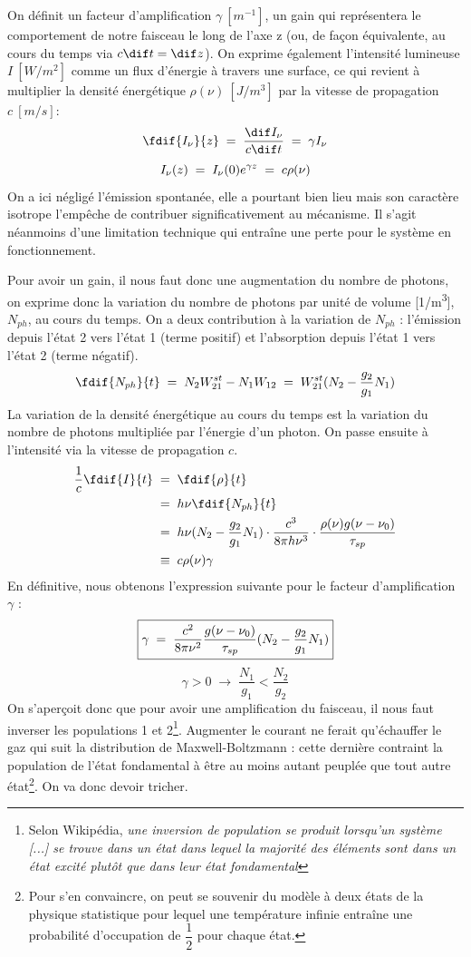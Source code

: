 On définit un facteur d'amplification $\gamma\ [\si{m^{-1}}]$, un gain qui représentera le comportement de notre faisceau le long de l'axe z (ou, de façon équivalente, au cours du temps via $c\dif t = \dif z$). On exprime également l'intensité lumineuse $I\ [\si{W/m^2}]$ comme un flux d'énergie à travers une surface, ce qui revient à multiplier la densité énergétique $\rho(\nu)\ [\si{J/m^3}]$ par la vitesse de propagation $c\ [\si{m/s}]$:
\[
    \fdif{I_\nu}{z} \eq \dfrac{\dif I_\nu}{c\dif t} \eq \gamma I_\nu
\]
\[
    I_\nu(z) \; = \; I_\nu(0) e^{\gamma z} \; = \; c\rho(\nu)
\]
On a ici négligé l'émission spontanée, elle a pourtant bien lieu mais son caractère isotrope l'empêche de contribuer significativement au mécanisme. Il s'agit néanmoins d'une limitation technique qui entraîne une perte pour le système en fonctionnement.

Pour avoir un gain, il nous faut donc une augmentation du nombre de photons, on exprime donc la variation du nombre de photons par unité de volume [\si{1/m^3}], $N_{ph}$, au cours du temps. On a deux contribution à la variation de $N_{ph}$ : l'émission depuis l'état 2 vers l'état 1 (terme positif) et l'absorption depuis l'état 1 vers l'état 2 (terme négatif).
\[
    \fdif{N_{ph}}{t}
    \eq N_2 W_{21}^{st} - N_1 W_{12}
    \eq W_{21}^{st} (N_2 - \dfrac{g_2}{g_1}N_1)
\]
La variation de la densité énergétique au cours du temps est la variation du nombre de photons multipliée par l'énergie d'un photon. On passe ensuite à l'intensité via la vitesse de propagation $c$.
\begin{align*}
    \dfrac{1}{c}\fdif{I}{t}
    &\eq  \fdif{\rho}{t}\\
    &\eq  h\nu\fdif{N_{ph}}{t}\\
    &\eq  h\nu (N_2 - \dfrac{g_2}{g_1}N_1) \cdot \dfrac{c^3}{8\pi h \nu^3} \cdot \dfrac{\rho(\nu) g(\nu - \nu_0)}{\tau_{sp}}\\
    &\;\equiv\;  c\rho(\nu)\gamma
\end{align*}
En définitive, nous obtenons l'expression suivante pour le facteur d'amplification $\gamma$ :
\begin{equation}
    \boxed{
        \gamma \; = \; \dfrac{c^2}{8\pi\nu^2}\dfrac{g(\nu - \nu_0)}{\tau_{sp}}(N_2 - \dfrac{g_2}{g_1}N_1)
    }
\end{equation}
\[
\boxed{
    \gamma > 0 \; \longrightarrow \; \dfrac{N_1}{g_1} < \dfrac{N_2}{g_2}
    }
\]
On s'aperçoit donc que pour avoir une amplification du faisceau, il nous faut inverser les populations 1 et 2\footnote{Selon Wikipédia, \textit{une inversion de population se produit lorsqu'un système [...] se trouve dans un état dans lequel la majorité des éléments sont dans un état excité plutôt que dans leur état fondamental}}. Augmenter le courant ne ferait qu'échauffer le gaz qui suit la distribution de Maxwell-Boltzmann : cette dernière contraint la population de l'état fondamental à être au moins autant peuplée que tout autre état\footnote{Pour s'en convaincre, on peut se souvenir du modèle à deux états de la physique statistique pour lequel une température infinie entraîne une probabilité d'occupation de $\dfrac{1}{2}$ pour chaque état.}. On va donc devoir tricher.


